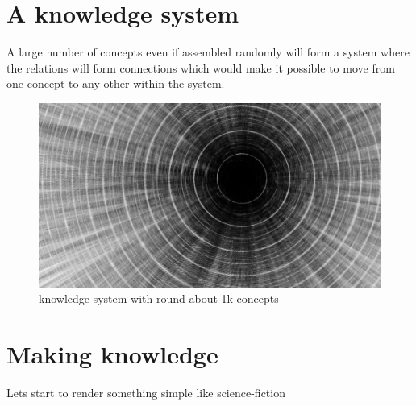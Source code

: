 \documentclass[11pt]{article}
\begin{document}
\section{A knowledge system }

A large number of concepts even if assembled randomly 
will form a system where the relations will form connections 
which would make it possible to move from one concept to any other within 
the system.

\begin{figure}[htp]
\centering
\includegraphics[scale=0.40]{img/1362924302_directories.png}
\caption{knowledge system with round about 1k concepts}
\label{every thought is interlocked somewhere at some point}
\end{figure}



\section{Making knowledge}
Lets start to render something simple like 
science-fiction
\end{document}
